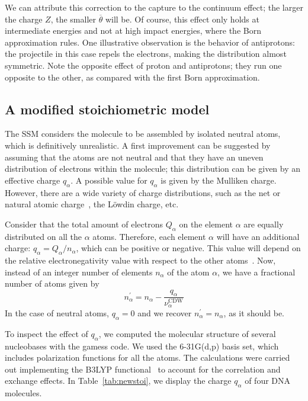 \documentclass[preprint,12pt]{article}
\begin{document}
We can attribute this correction to the capture to the continuum effect;
the larger the charge $Z$, the smaller $\overline{\theta}$ will be. Of 
course, this effect only holds at intermediate energies and not at high 
impact energies, where the Born approximation rules. One illustrative 
observation is the behavior of antiprotons: the projectile in this case 
repels the electrons, making the distribution almost symmetric. 
Note the opposite effect of proton and antiprotons; they run one 
opposite to the other, as compared with the first Born approximation.

\subsection{A modified stoichiometric model}

The SSM considers the molecule to be assembled by isolated neutral atoms, 
which is definitively unrealistic. A first improvement can be suggested 
by assuming that the atoms are not neutral and that they have an uneven
distribution of electrons within the molecule; this distribution can be
given by an effective charge $q_{\alpha}$. A possible value for 
$q_{\alpha}$ is given by the Mulliken charge. However, there are a wide
variety of charge distributions, such as the net or natural atomic
charge~\cite{lee2003}, the L\"owdin charge, etc.

Consider that the total amount of electrons $Q_{\alpha }$ on the element
$\alpha$ are equally distributed on all the $\alpha$ atoms. Therefore, 
each element $\alpha$ will have an additional charge: 
$q_{\alpha}=Q_{\alpha}/n_{\alpha}$, which can be positive or negative.
This value will depend on the relative electronegativity value with 
respect to the other atoms~\cite{rappe1991}. Now, instead of an
integer number of elements $n_{\alpha}$ of the atom $\alpha$, we have a 
fractional number of atoms given by 
\begin{equation}
n_{\alpha }^{\prime }=n_{\alpha }-
\frac{q_{\alpha }}{\nu_{\alpha }^{\text{CDW}}}
\label{eq:newstoi}
\end{equation}%
In the case of neutral atoms, $q_{\alpha}=0$ and we recover 
$n_{\alpha}^{\prime}=n_{\alpha}$, as it should be.

To inspect the effect of $q_{\alpha}$, we computed the molecular
structure of several nucleobases with the {\sc gamess} code. We 
used the 6-31G(d,p) basis set, which includes polarization 
functions for all the atoms. The calculations were carried out 
implementing the B3LYP functional~\cite{Becke1993,Stephens1994} to 
account for the correlation and exchange effects. 
In Table~\ref{tab:newstoi}, we display the charge $q_{\alpha}$ of four 
DNA molecules. 
\end{document}
